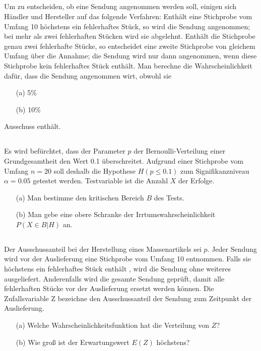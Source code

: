 \documentclass[ngerman]{scrartcl}
\begin{document}
\subsection{}
Um zu entscheiden, ob eine Sendung angenommen werden soll, einigen sich Händler und Hersteller auf das folgende Verfahren: Enthält eine Stichprobe vom Umfang 10 höchstens ein fehlerhaftes Stück, so wird die Sendung angenommen; bei mehr als zwei fehlerhaften Stücken wird sie abgelehnt. Enthält die Stichprobe genau zwei fehlerhafte Stücke, so entscheidet eine zweite Stichprobe von gleichem Umfang über die Annahme; die Sendung wird nur dann angenommen, wenn diese Stichprobe kein fehlerhaftes Stück enthält. Man berechne die Wahrscheinlichkeit dafür, dass die Sendung angenommen wirt, obwohl sie 
\begin{enumerate}
	\item[(a)] 5\%
	\item[(b)] 10\%
\end{enumerate}
Ausschuss enthält.

\subsection{}
Es wird befürchtet, dass der Parameter $p$ der Bernoulli-Verteilung einer Grundgesamtheit den Wert 0.1 überschreitet. Aufgrund einer Stichprobe vom Umfang $n=20$ soll deshalb die Hypothese $H(p\leq 0.1)$ zum Signifikanzniveau $\alpha = 0.05$ getestet werden. Testvariable ist die Anzahl $X$ der Erfolge.
\begin{enumerate}
	\item[(a)] Man bestimme den kritischen Bereich $B$ des Tests.
	\item[(b)] Man gebe eine obere Schranke der Irrtumswahrscheinlichkeit $P(X\in B | H)$ an.
\end{enumerate}

\subsection{}
Der Ausschussanteil bei der Herstellung eines Massenartikels sei $p$. Jeder Sendung wird vor der Auslieferung eine Stichprobe vom Umfang 10 entnommen. Falls sie höchstens ein fehlerhaftes Stück enthält , wird die Sendung ohne weiteres ausgeliefert. Anderenfalls wird die gesamte Sendung geprüft, damit alle fehlerhaften Stücke vor der Auslieferung ersetzt werden können. Die Zufallsvariable Z bezeichne den Ausschussanteil der Sendung zum Zeitpunkt der Auslieferung.
\begin{enumerate}
	\item[(a)] Welche Wahrscheinlichkeitsfunktion hat die Verteilung von $Z$?
	\item[(b)] Wie groß ist der Erwartungswert $E(Z)$ höchstens?
\end{enumerate}
\end{document}
